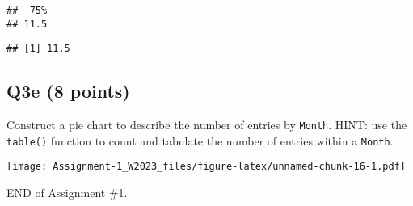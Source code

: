 \documentclass[
]{article}
\newenvironment{Shaded}{\begin{snugshade}}{\end{snugshade}}
\newcommand{\AttributeTok}[1]{\textcolor[rgb]{0.13,0.29,0.53}{#1}}
\newcommand{\CommentTok}[1]{\textcolor[rgb]{0.56,0.35,0.01}{\textit{#1}}}
\newcommand{\FloatTok}[1]{\textcolor[rgb]{0.00,0.00,0.81}{#1}}
\newcommand{\FunctionTok}[1]{\textcolor[rgb]{0.13,0.29,0.53}{\textbf{#1}}}
\newcommand{\NormalTok}[1]{#1}
\newcommand{\OtherTok}[1]{\textcolor[rgb]{0.56,0.35,0.01}{#1}}
\newcommand{\SpecialCharTok}[1]{\textcolor[rgb]{0.81,0.36,0.00}{\textbf{#1}}}
\newcommand{\StringTok}[1]{\textcolor[rgb]{0.31,0.60,0.02}{#1}}
\begin{document}
\begin{verbatim}
##  75% 
## 11.5
\end{verbatim}

\begin{Shaded}
\end{Shaded}

\begin{verbatim}
## [1] 11.5
\end{verbatim}

\hypertarget{q3e-8-points}{%
\subsection{Q3e (8 points)}\label{q3e-8-points}}

Construct a pie chart to describe the number of entries by
\texttt{Month}. HINT: use the \texttt{table()} function to count and
tabulate the number of entries within a \texttt{Month}.

\begin{Shaded}
\end{Shaded}

\texttt{[image: Assignment-1\_W2023\_files/figure-latex/unnamed-chunk-16-1.pdf]}

END of Assignment \#1.
\end{document}
